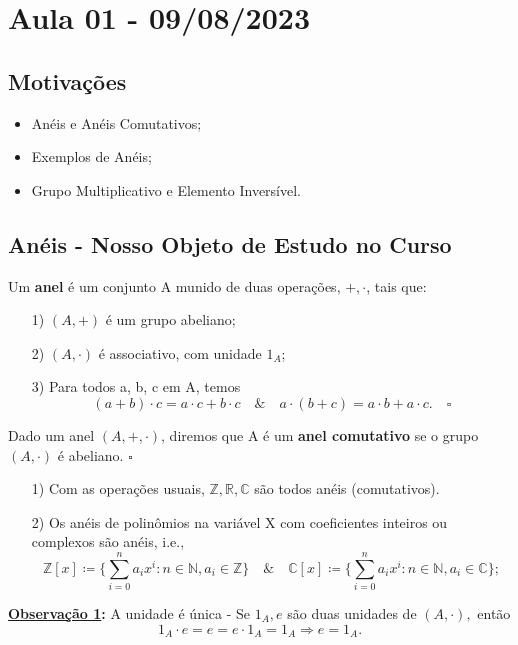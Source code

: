 \documentclass[AlgebraII/algebraII_notes.tex]{subfiles}
\begin{document}
\section{Aula 01 - 09/08/2023}
\subsection{Motivações}
\begin{itemize}
	\item Anéis e Anéis Comutativos;
	\item Exemplos de Anéis;
	\item Grupo Multiplicativo e Elemento Inversível.
\end{itemize}
\subsection{Anéis - Nosso Objeto de Estudo no Curso}
\begin{def*}
	Um \textbf{anel} é um conjunto A munido de duas operações, \(+, \cdot \), tais que:
	\begin{itemize}
		\item[1)] \((A, +)\) é um grupo abeliano;
		\item[2)] \((A, \cdot )\) é associativo, com unidade \(1_{A}\);
		\item[3)] Para todos a, b, c em A, temos
		      \[
			      (a+b)\cdot c = a \cdot c + b \cdot c \quad\&\quad a \cdot (b+c) = a \cdot b + a \cdot c.\quad\square
		      \]
	\end{itemize}
\end{def*}
\begin{def*}
	Dado um anel \((A, +, \cdot )\), diremos que A é um \textbf{anel comutativo} se o grupo \((A, \cdot )\) é abeliano. \(\square\)
\end{def*}
\begin{example}
	\begin{itemize}
		\item[1)] Com as operações usuais, \(\mathbb{Z}, \mathbb{R}, \mathbb{C}\) são todos anéis (comutativos).
		\item[2)] Os anéis de polinômios na variável X com coeficientes inteiros ou complexos são anéis, i.e.,
		      \[
			      \mathbb{Z}[x]\coloneqq \biggl\{\sum\limits_{i=0}^{n}a_{i}x^{i}: n\in \mathbb{N}, a_{i}\in \mathbb{Z}\biggr\}\quad\&\quad \mathbb{C}[x]\coloneqq \biggl\{\sum\limits_{i=0}^{n}a_{i}x^{i}:n\in \mathbb{N}, a_{i}\in \mathbb{C}\biggr\};
		      \]

	\end{itemize}
\end{example}
\textbf{\underline{Observação 1}:} A unidade é única - Se \(1_{A}, e\) são duas unidades de \((A, \cdot ),\) então
\[
	1_{A}\cdot e = e = e \cdot 1_{A} = 1_{A} \Rightarrow e = 1_{A}.
\]
\end{document}
